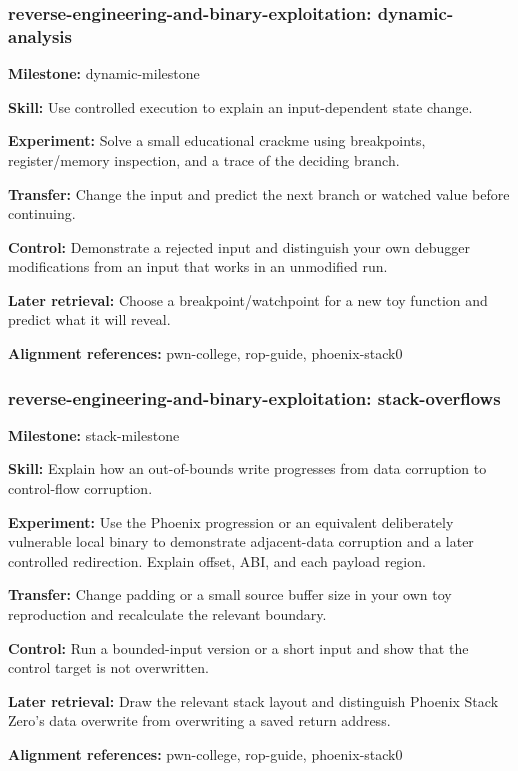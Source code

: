 \subsubsection{reverse-engineering-and-binary-exploitation: dynamic-analysis}
\noindent\textbf{Milestone:} dynamic-milestone\par
\noindent\textbf{Skill:} Use controlled execution to explain an input-dependent state change.\par
\noindent\textbf{Experiment:} Solve a small educational crackme using breakpoints, register/memory inspection, and a trace of the deciding branch.\par
\noindent\textbf{Transfer:} Change the input and predict the next branch or watched value before continuing.\par
\noindent\textbf{Control:} Demonstrate a rejected input and distinguish your own debugger modifications from an input that works in an unmodified run.\par
\noindent\textbf{Later retrieval:} Choose a breakpoint/watchpoint for a new toy function and predict what it will reveal.\par
\noindent\textbf{Alignment references:} pwn-college, rop-guide, phoenix-stack0\par
\subsubsection{reverse-engineering-and-binary-exploitation: stack-overflows}
\noindent\textbf{Milestone:} stack-milestone\par
\noindent\textbf{Skill:} Explain how an out-of-bounds write progresses from data corruption to control-flow corruption.\par
\noindent\textbf{Experiment:} Use the Phoenix progression or an equivalent deliberately vulnerable local binary to demonstrate adjacent-data corruption and a later controlled redirection. Explain offset, ABI, and each payload region.\par
\noindent\textbf{Transfer:} Change padding or a small source buffer size in your own toy reproduction and recalculate the relevant boundary.\par
\noindent\textbf{Control:} Run a bounded-input version or a short input and show that the control target is not overwritten.\par
\noindent\textbf{Later retrieval:} Draw the relevant stack layout and distinguish Phoenix Stack Zero’s data overwrite from overwriting a saved return address.\par
\noindent\textbf{Alignment references:} pwn-college, rop-guide, phoenix-stack0\par
